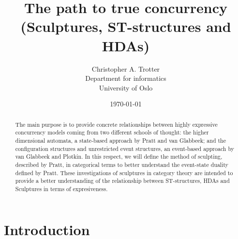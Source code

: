 \documentclass[9pt, english, a4paper]{article}
\title{The path to true concurrency\\(Sculptures, ST-structures and HDAs)}
\author{Christopher A. Trotter \\ Department for informatics\\ University of Oslo}
\date{\today{}}
\theoremstyle{definition}
\begin{document}
\maketitle{}

\begin{abstract}
	\noindent The main purpose is to provide concrete relationships between highly expressive concurrency models coming from two different schools of thought: the higher dimensional automata, a state-based approach by Pratt and van Glabbeek; and the configuration structures and unrestricted event structures, an event-based approach by van Glabbeek and Plotkin. In this respect, we will define the method of sculpting, described by Pratt, in categorical terms to better understand the event-state duality defined by Pratt. These investigations of sculptures in category theory are intended to provide a better understanding of the relationship between ST-structures, HDAs and Sculptures in terms of expresiveness. 
\end{abstract}



\section{Introduction}
\end{document}
